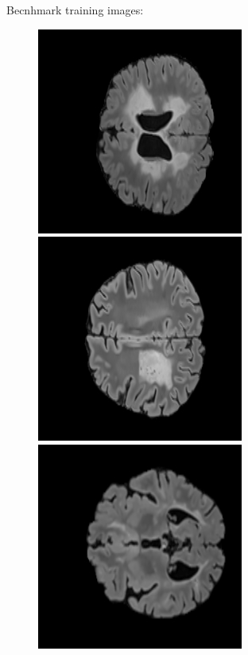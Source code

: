 \newpage
Becnhmark training images:
\begin{figure}[!htb]
    \includegraphics[width=.32\textwidth]{images/tr_images/tr175_input.jpg}\hfill
    \includegraphics[width=.32\textwidth]{images/tr_images/tr943_input.jpg}\hfill
    \includegraphics[width=.32\textwidth]{images/tr_images/tr1426_input.jpg}
    \hfill
    \hfill

\end{figure}
